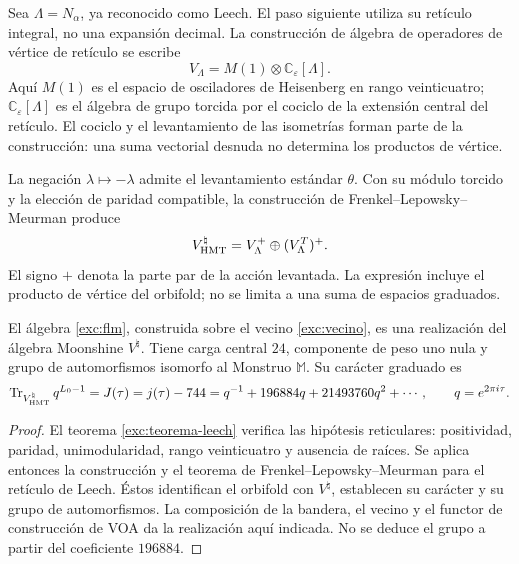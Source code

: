 Sea $\Lambda=N_\alpha$, ya reconocido como Leech. El paso siguiente
utiliza su retículo integral, no una expansión decimal. La construcción
de álgebra de operadores de vértice de retículo se escribe
\[
 V_\Lambda=M(1)\otimes\mathbb C_\varepsilon[\Lambda].
\]
Aquí $M(1)$ es el espacio de osciladores de Heisenberg en rango
veinticuatro; $\mathbb C_\varepsilon[\Lambda]$ es el álgebra de grupo
torcida por el cociclo de la extensión central del retículo. El
cociclo y el levantamiento de las isometrías forman parte de la
construcción: una suma vectorial desnuda no determina los productos
de vértice.

La negación $\lambda\mapsto-\lambda$ admite el levantamiento estándar
$\theta$. Con su módulo torcido y la elección de paridad compatible,
la construcción de Frenkel--Lepowsky--Meurman produce
\begin{equation}
 V^\natural_{\rm HMT}
   =V_\Lambda^+\oplus(V_\Lambda^T)^+.
 \label{exc:flm}
\end{equation}
El signo $+$ denota la parte par de la acción levantada. La expresión
incluye el producto de vértice del orbifold; no se limita a una suma
de espacios graduados.

\begin{theorem}
\label{exc:moonshine}
El álgebra \eqref{exc:flm}, construida sobre el vecino
\eqref{exc:vecino}, es una realización del álgebra Moonshine
$V^\natural$. Tiene carga central $24$, componente de peso uno nula
y grupo de automorfismos isomorfo al Monstruo $\mathbb M$. Su carácter
graduado es
\begin{equation}
 \operatorname{Tr}_{V^\natural_{\rm HMT}}q^{L_0-1}
   =J(\tau)=j(\tau)-744
   =q^{-1}+196884q+21493760q^2+\cdots,
 \qquad q=e^{2\pi i\tau}.
 \label{exc:j}
\end{equation}
\end{theorem}

\begin{proof}
El teorema \ref{exc:teorema-leech} verifica las hipótesis reticulares:
positividad, paridad, unimodularidad, rango veinticuatro y ausencia de
raíces. Se aplica entonces la construcción y el teorema de
Frenkel--Lepowsky--Meurman para el retículo de Leech. Éstos identifican
el orbifold con $V^\natural$, establecen su carácter y su grupo de
automorfismos. La composición de la bandera, el vecino y el functor
de construcción de VOA da la realización aquí indicada. No se deduce
el grupo a partir del coeficiente $196884$.
\end{proof}

